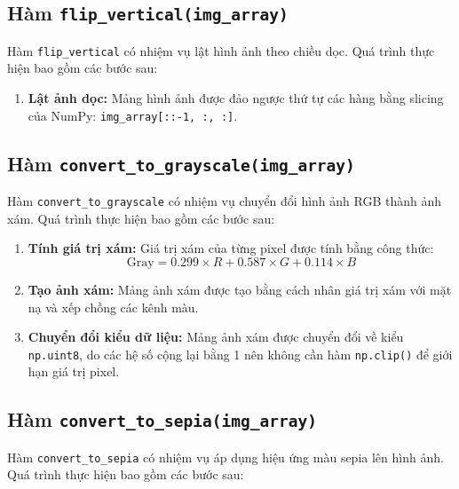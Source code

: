 \subsection{Hàm \texttt{flip\_vertical(img\_array)}}
Hàm \texttt{flip\_vertical} có nhiệm vụ lật hình ảnh theo chiều dọc. Quá trình thực hiện bao gồm các bước sau:

\begin{enumerate}

	\item \textbf{Lật ảnh dọc:}
	      Mảng hình ảnh được đảo ngược thứ tự các hàng bằng slicing của NumPy: \texttt{img\_array[::-1, :, :]}.

\end{enumerate}

\subsection{Hàm \texttt{convert\_to\_grayscale(img\_array)}}
Hàm \texttt{convert\_to\_grayscale} có nhiệm vụ chuyển đổi hình ảnh RGB thành ảnh xám. Quá trình thực hiện bao gồm các bước sau:

\begin{enumerate}

	\item \textbf{Tính giá trị xám:}
	      Giá trị xám của từng pixel được tính bằng công thức:
	      \[
		      \text{Gray} = 0.299 \times R + 0.587 \times G + 0.114 \times B
	      \]

	\item \textbf{Tạo ảnh xám:}
	      Mảng ảnh xám được tạo bằng cách nhân giá trị xám với mặt nạ và xếp chồng các kênh màu.

	\item \textbf{Chuyển đổi kiểu dữ liệu:}
	      Mảng ảnh xám được chuyển đổi về kiểu \texttt{np.uint8}, do các hệ số cộng lại bằng 1 nên không cần hàm \texttt{np.clip()} để giới hạn giá trị pixel.

\end{enumerate}

\subsection{Hàm \texttt{convert\_to\_sepia(img\_array)}}
Hàm \texttt{convert\_to\_sepia} có nhiệm vụ áp dụng hiệu ứng màu sepia lên hình ảnh. Quá trình thực hiện bao gồm các bước sau:

